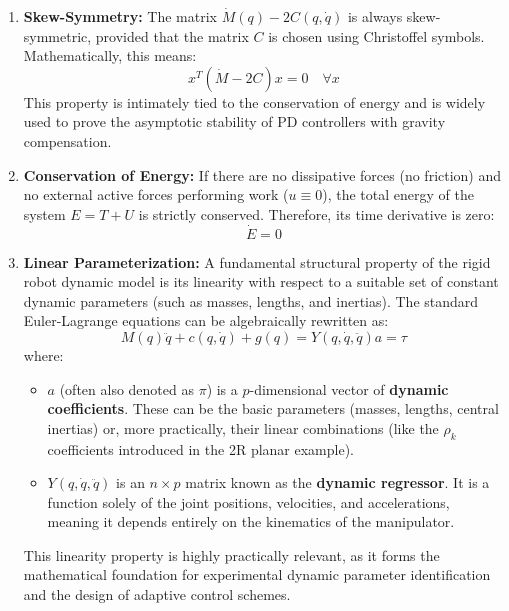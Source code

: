 \documentclass[11pt,a4paper]{article}
\begin{document}
\begin{enumerate}
    \item \textbf{Skew-Symmetry:} The matrix $\dot{M}(q) - 2C(q,\dot{q})$ is always skew-symmetric, provided that the matrix $C$ is chosen using Christoffel symbols. Mathematically, this means:
    \begin{equation}
        x^T(\dot{M} - 2C)x = 0 \quad \forall x
    \end{equation}
    This property is intimately tied to the conservation of energy and is widely used to prove the asymptotic stability of PD controllers with gravity compensation.
    
    \item \textbf{Conservation of Energy:} If there are no dissipative forces (no friction) and no external active forces performing work ($u \equiv 0$), the total energy of the system $E = T + U$ is strictly conserved. Therefore, its time derivative is zero:
    \begin{equation}
        \dot{E} = 0
    \end{equation}
    \item \textbf{Linear Parameterization:} A fundamental structural property of the rigid robot dynamic model is its linearity with respect to a suitable set of constant dynamic parameters (such as masses, lengths, and inertias). The standard Euler-Lagrange equations can be algebraically rewritten as:
\begin{equation}
    M(q)\ddot{q} + c(q, \dot{q}) + g(q) = Y(q, \dot{q}, \ddot{q}) a = \tau
\end{equation}
where:
\begin{itemize}
    \item $a$ (often also denoted as $\pi$) is a $p$-dimensional vector of \textbf{dynamic coefficients}. These can be the basic parameters (masses, lengths, central inertias) or, more practically, their linear combinations (like the $\rho_k$ coefficients introduced in the 2R planar example).
    \item $Y(q, \dot{q}, \ddot{q})$ is an $n \times p$ matrix known as the \textbf{dynamic regressor}. It is a function solely of the joint positions, velocities, and accelerations, meaning it depends entirely on the kinematics of the manipulator.
\end{itemize}

This linearity property is highly practically relevant, as it forms the mathematical foundation for experimental dynamic parameter identification and the design of adaptive control schemes.
\end{enumerate}
\end{document}

